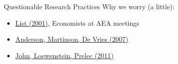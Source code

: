 \documentclass{beamer}
\begin{document}
\begin{frame}{Questionable Research Practices}
Why we worry (a little):
\begin{itemize}[<.->]
\item \href{http://onlinelibrary.wiley.com/doi/10.1111/j.1465-7295.2001.tb00058.x/abstract}{List (2001)}, Economists at AEA meetings
\item \href{http://www.jstor.org/stable/pdf/10.1525/jer.2007.2.4.3.pdf}{Anderson, Martinson, De Vries (2007)}
\item \href{http://pss.sagepub.com/content/23/5/524}{John, Loewenstein, Prelec (2011)}
\end{itemize}
\end{frame}

{ %
    \begin{frame}[plain]
     \end{frame}
}
\end{document}
